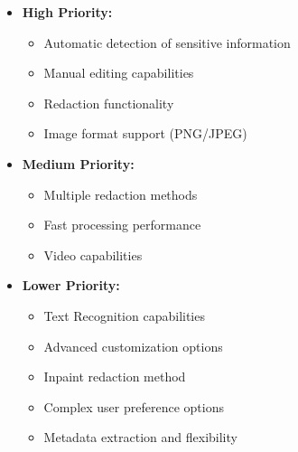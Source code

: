 \begin{itemize}
    \item \textbf{High Priority:}
    \begin{itemize}
        \item Automatic detection of sensitive information
        \item Manual editing capabilities
        \item Redaction functionality
        \item Image format support (PNG/JPEG)
    \end{itemize}

    \item \textbf{Medium Priority:}
    \begin{itemize}
        \item Multiple redaction methods
        \item Fast processing performance
        \item Video capabilities
    \end{itemize} 

    \item \textbf{Lower Priority:}
    \begin{itemize}
        \item Text Recognition capabilities
        \item Advanced customization options
        \item Inpaint redaction method
        \item Complex user preference options
        \item Metadata extraction and flexibility
    \end{itemize}
\end{itemize}

